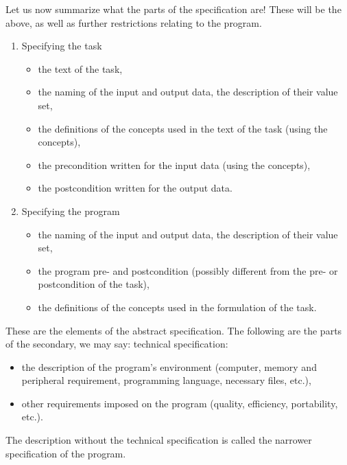 \documentclass[margin=0px]{article}
\begin{document}
Let us now summarize what the parts of the specification are! These will be the above, as well as further restrictions relating to the program.

\begin{enumerate}
    \item Specifying the task
          \begin{itemize}
              \item the text of the task,
              \item the naming of the input and output data, the description of their value set,
              \item the definitions of the concepts used in the text of the task (using the concepts),
              \item the precondition written for the input data (using the concepts),
              \item the postcondition written for the output data.
          \end{itemize}
    \item Specifying the program
          \begin{itemize}
              \item the naming of the input and output data, the description of their value set,
              \item the program pre- and postcondition (possibly different from the pre- or postcondition of the task),
              \item the definitions of the concepts used in the formulation of the task.
          \end{itemize}
\end{enumerate}

\noindent These are the elements of the abstract specification. The following are the parts of the secondary, we may say: technical specification:

\begin{itemize}
    \item the description of the program's environment (computer, memory and peripheral requirement, programming language, necessary files, etc.),
    \item other requirements imposed on the program (quality, efficiency, portability, etc.).
\end{itemize}

\noindent The description without the technical specification is called the narrower specification of the program.\\
\end{document}
